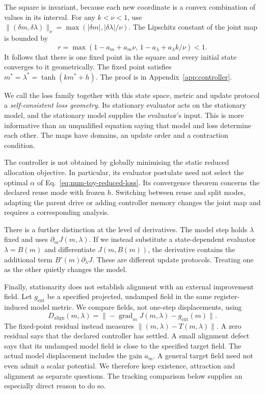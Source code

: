 The square is invariant, because each new coordinate is a convex combination of values in its interval. For any \(k<\nu<1\), use
\(\|(\delta m,\delta\lambda)\|_\nu
 =\max(|\delta m|,|\delta\lambda|/\nu)\).
The Lipschitz constant of the joint map is bounded by
\begin{equation}
 r=\max\!\left(1-a_m+a_m\nu,\,
             1-a_\lambda+a_\lambda k/\nu\right)<1 .
 \label{eq:contraction-factor}
\end{equation}
It follows that there is one fixed point in the square and every initial state converges to it geometrically. The fixed point satisfies
\(m^*=\lambda^*=\tanh(km^*+h)\).
The proof is in Appendix~\ref{app:controller}.

We call the loss family together with this state space, metric and update protocol a \emph{self-consistent loss geometry}. Its stationary evaluator acts on the stationary model, and the stationary model supplies the evaluator's input. This is more informative than an unqualified equation saying that model and loss determine each other. The maps have domains, an update order and a contraction condition.

The controller is not obtained by globally minimising the static reduced allocation objective. In particular, its evaluator postulate need not select the optimal \(\alpha\) of Eq.~\eqref{eq:num-toy-reduced-loss}. Its convergence theorem concerns the declared reuse mode with frozen \(h\). Switching between reuse and split modes, adapting the parent drive or adding controller memory changes the joint map and requires a corresponding analysis.

There is a further distinction at the level of derivatives. The model step holds \(\lambda\) fixed and uses \(\partial_m J(m,\lambda)\). If we instead substitute a state-dependent evaluator \(\lambda=B(m)\) and differentiate \(J(m,B(m))\), the derivative contains the additional term
\(B'(m)\partial_\lambda J\).
These are different update protocols. Treating one as the other quietly changes the model.

Finally, stationarity does not establish alignment with an external improvement field. Let \(g_{\mathrm{ext}}\) be a specified projected, undamped field in the same register-induced model metric. We compare fields, not one-step displacements, using
\begin{equation}
 D_{\mathrm{align}}(m,\lambda)
       =\|-\operatorname{grad}_m J(m,\lambda)-g_{\mathrm{ext}}(m)\|.
 \label{eq:alignment-defect}
\end{equation}
The fixed-point residual instead measures
\(\|(m,\lambda)-T(m,\lambda)\|\).
A zero residual says that the declared controller has settled. A small alignment defect says that its undamped model field is close to the specified target field. The actual model displacement includes the gain \(a_m\). A general target field need not even admit a scalar potential. We therefore keep existence, attraction and alignment as separate questions. The tracking comparison below supplies an especially direct reason to do so.
